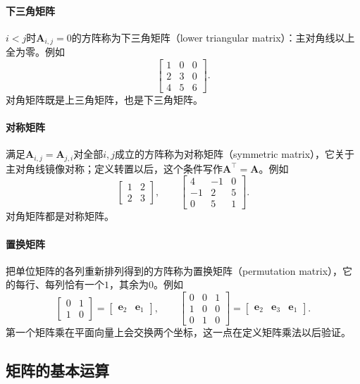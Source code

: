 \paragraph{下三角矩阵}
$i<j$时$\bm A_{i,j}=0$的方阵称为下三角矩阵（lower triangular matrix）：主对角线以上全为零。例如
\[
 \begin{bmatrix}1&0&0\\2&3&0\\4&5&6\end{bmatrix}.
\]
对角矩阵既是上三角矩阵，也是下三角矩阵。

\paragraph{对称矩阵}
满足$\bm A_{i,j}=\bm A_{j,i}$对全部$i,j$成立的方阵称为对称矩阵（symmetric matrix），它关于主对角线镜像对称；定义转置以后，这个条件写作$\bm A^\top=\bm A$。例如
\[
\begin{bmatrix}1&2\\2&3\end{bmatrix},\qquad
\begin{bmatrix}4&-1&0\\-1&2&5\\0&5&1\end{bmatrix}.
\]
对角矩阵都是对称矩阵。

\paragraph{置换矩阵}
把单位矩阵的各列重新排列得到的方阵称为置换矩阵（permutation matrix），它的每行、每列恰有一个$1$，其余为$0$。例如
\[
\begin{bmatrix}0&1\\1&0\end{bmatrix}=\begin{bmatrix}\bm e_2&\bm e_1\end{bmatrix},\qquad
\begin{bmatrix}0&0&1\\1&0&0\\0&1&0\end{bmatrix}=\begin{bmatrix}\bm e_2&\bm e_3&\bm e_1\end{bmatrix}.
\]
第一个矩阵乘在平面向量上会交换两个坐标，这一点在定义矩阵乘法以后验证。

\subsection{矩阵的基本运算}
\label{sec:ls-matrix-operation-properties}
\label{sec:ls-matrix-operations}
\label{sec:ls-multiplication}


